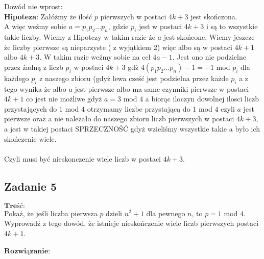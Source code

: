 Dowód nie wprost:
\\
\newline \textbf{Hipoteza}: Załóżmy że ilość $p$ pierwszych w postaci $4k + 3$ jest skończona.
\\ \newline
A więc weźmy sobie $a = p_{1}p_{2}...p_{n}$, gdzie $p_{i}$ jest w postaci $4k + 3$ i są to wszystkie takie liczby. Wiemy z Hipotezy w takim razie że $a$ jest skońcone. Wiemy jeszcze że liczby pierwsze są nieparzyste ( z wyjątkiem 2) więc albo są w postaci $4k + 1$ albo $4k + 3$. W takim razie weźmy sobie na cel $4a - 1$. Jest ono nie podzielne przez żadną z liczb $p_{i}$ w postaci $4k + 3$ gdż $4(p_{1}p_{2}...p_{n}) - 1 = -1$ mod $p_{i}$ dla każdego $p_{i}$ z naszego zbioru (gdyż lewa cześć jest podzielna przez każde $p_{i}$ a z tego wynika że albo $a$ jest pierwsze albo ma same czynniki pierwsze w postaci $4k + 1$ co jest nie możliwe gdyż $a = 3$ mod $4$ a biorąc iloczyn dowolnej ilosci liczb przystających do $1$ mod $4$ otrzymamy liczbe przystającą do $1$ mod $4$ czyli $a$ jest pierwsze oraz a nie należało do naszego zbioru liczb pierwszych w postaci $4k+3$, a jest w takiej postaci SPRZECZNOŚĆ gdyż wzieliśmy wszystkie takie a było ich skończenie wiele.
\\ \\
Czyli musi być nieskonczenie wiele liczb w postaci $4k +3$.



\subsection{Zadanie 5}
$\textbf{Treść:}$ \\ \newline
Pokaż, że jeśli liczba pierwsza $p$ dzieli $n^{2} +1$
dla pewnego $n$, to $p = 1$ mod $4$.
Wyprowadź z tego dowód, że istnieje nieskończenie wiele liczb pierwszych postaci $4k + 1$.
\\
\\
$\textbf{Rozwiązanie:}$ \\

